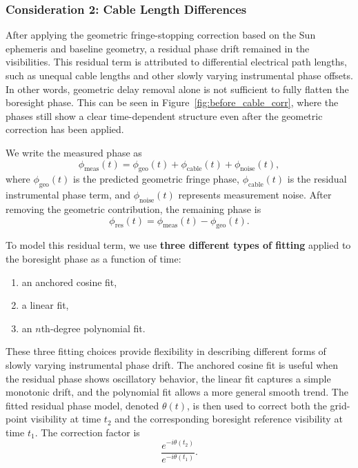 \documentclass[12pt]{extarticle}
\begin{document}
\subsubsection{Consideration 2: Cable Length Differences}
After applying the geometric fringe-stopping correction based on the Sun ephemeris and baseline geometry, a residual phase drift remained in the visibilities. This residual term is attributed to differential electrical path lengths, such as unequal cable lengths and other slowly varying instrumental phase offsets. In other words, geometric delay removal alone is not sufficient to fully flatten the boresight phase. This can be seen in Figure~\ref{fig:before_cable_corr}, where the phases still show a clear time-dependent structure even after the geometric correction has been applied.

We write the measured phase as
\begin{equation}
\phi_{\mathrm{meas}}(t) = \phi_{\mathrm{geo}}(t) + \phi_{\mathrm{cable}}(t) + \phi_{\mathrm{noise}}(t),
\end{equation}
where $\phi_{\mathrm{geo}}(t)$ is the predicted geometric fringe phase, $\phi_{\mathrm{cable}}(t)$ is the residual instrumental phase term, and $\phi_{\mathrm{noise}}(t)$ represents measurement noise. After removing the geometric contribution, the remaining phase is
\begin{equation}
\phi_{\mathrm{res}}(t) = \phi_{\mathrm{meas}}(t) - \phi_{\mathrm{geo}}(t).
\end{equation}

To model this residual term, we use \textbf{three different types of fitting} applied to the boresight phase as a function of time:
\begin{enumerate}
    \item an anchored cosine fit,
    \item a linear fit,
    \item an $n$th-degree polynomial fit.
\end{enumerate}

These three fitting choices provide flexibility in describing different forms of slowly varying instrumental phase drift. The anchored cosine fit is useful when the residual phase shows oscillatory behavior, the linear fit captures a simple monotonic drift, and the polynomial fit allows a more general smooth trend. The fitted residual phase model, denoted $\theta(t)$, is then used to correct both the grid-point visibility at time $t_2$ and the corresponding boresight reference visibility at time $t_1$. The correction factor is
\begin{equation}
\frac{e^{-i\theta(t_2)}}{e^{-i\theta(t_1)}}.
\end{equation}
\end{document}
